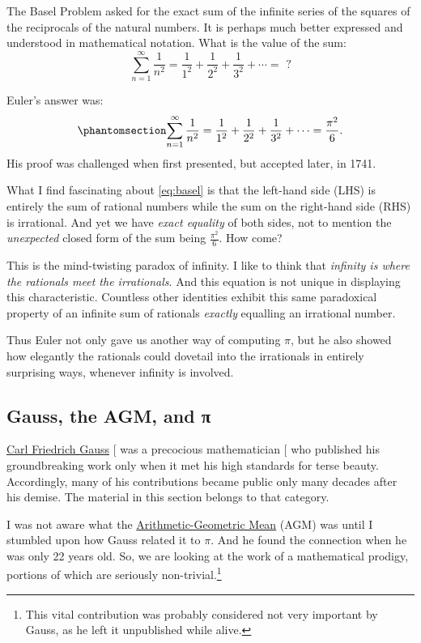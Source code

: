 \documentclass[
  a4paper,
]{article}
\begin{document}
The Basel Problem asked for the exact sum of the infinite series of the
squares of the reciprocals of the natural numbers. It is perhaps much
better expressed and understood in mathematical notation. What is the
value of the sum: \[
\sum_{n=1}^\infty \frac{1}{n^2} = \frac{1}{1^2} + \frac{1}{2^2} + \frac{1}{3^2} + \cdots = \mbox{ ?}
\]

Euler's answer was: \begin{equation}\phantomsection\label{eq:basel}{
\sum_{n=1}^\infty \frac{1}{n^2} = \frac{1}{1^2} + \frac{1}{2^2} + \frac{1}{3^2} + \cdots = \frac{\pi^2}{6}.
}\end{equation} His proof was challenged when first presented, but
accepted later, in 1741.

What I find fascinating about \cref{eq:basel} is that the left-hand side
(LHS) is entirely the sum of rational numbers while the sum on the
right-hand side (RHS) is irrational. And yet we have \emph{exact
equality} of both sides, not to mention the \emph{unexpected} closed
form of the sum being \(\tfrac{\pi^2}{6}\). How come?

This is the mind-twisting paradox of infinity. I like to think that
\emph{infinity is where the rationals meet the irrationals}. And this
equation is not unique in displaying this characteristic. Countless
other identities exhibit this same paradoxical property of an infinite
sum of rationals \emph{exactly} equalling an irrational number.

Thus Euler not only gave us another way of computing \(\pi\), but he
also showed how elegantly the rationals could dovetail into the
irrationals in entirely surprising ways, whenever infinity is involved.

\subsection{Gauss, the AGM, and π}\label{gauss-the-agm-and-ux3c0}

\href{https://en.wikipedia.org/wiki/Carl_Friedrich_Gauss}{Carl Friedrich
Gauss} {[}\citeproc{ref-gauss-wiki}{30}{]} was a precocious
mathematician {[}\citeproc{ref-gauss-bio}{31}{]} who published his
groundbreaking work only when it met his high standards for terse
beauty. Accordingly, many of his contributions became public only many
decades after his demise. The material in this section belongs to that
category.

I was not aware what the
\href{https://mathworld.wolfram.com/Arithmetic-GeometricMean.html}{Arithmetic-Geometric
Mean} (AGM) was until I stumbled upon how Gauss related it to \(\pi\).
And he found the connection when he was only 22 years old. So, we are
looking at the work of a mathematical prodigy, portions of which are
seriously non-trivial.\footnote{This vital contribution was probably
  considered not very important by Gauss, as he left it unpublished
  while alive.}
\end{document}
